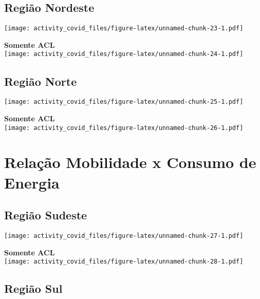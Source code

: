 \documentclass[
]{article}
\begin{document}
\pagebreak

\hypertarget{regiuxe3o-nordeste-2}{%
\subsection{Região Nordeste}\label{regiuxe3o-nordeste-2}}

\texttt{[image: activity\_covid\_files/figure-latex/unnamed-chunk-23-1.pdf]}

\pagebreak

\textbf{Somente ACL}\\
\texttt{[image: activity\_covid\_files/figure-latex/unnamed-chunk-24-1.pdf]}

\pagebreak

\hypertarget{regiuxe3o-norte-2}{%
\subsection{Região Norte}\label{regiuxe3o-norte-2}}

\texttt{[image: activity\_covid\_files/figure-latex/unnamed-chunk-25-1.pdf]}

\pagebreak

\textbf{Somente ACL}\\
\texttt{[image: activity\_covid\_files/figure-latex/unnamed-chunk-26-1.pdf]}

\hypertarget{relauxe7uxe3o-mobilidade-x-consumo-de-energia}{%
\section{Relação Mobilidade x Consumo de
Energia}\label{relauxe7uxe3o-mobilidade-x-consumo-de-energia}}

\hypertarget{regiuxe3o-sudeste-3}{%
\subsection{Região Sudeste}\label{regiuxe3o-sudeste-3}}

\texttt{[image: activity\_covid\_files/figure-latex/unnamed-chunk-27-1.pdf]}

\pagebreak

\textbf{Somente ACL}\\
\texttt{[image: activity\_covid\_files/figure-latex/unnamed-chunk-28-1.pdf]}

\pagebreak

\hypertarget{regiuxe3o-sul-3}{%
\subsection{Região Sul}\label{regiuxe3o-sul-3}}
\end{document}
